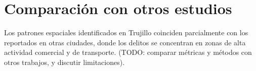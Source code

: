 
\section{Comparación con otros estudios}

\label{sec:comparacion}

Los patrones espaciales identificados en Trujillo coinciden parcialmente
con los reportados en otras ciudades, donde los delitos se concentran
en zonas de alta actividad comercial y de transporte. (TODO: comparar
métricas y métodos con otros trabajos, y discutir limitaciones).
